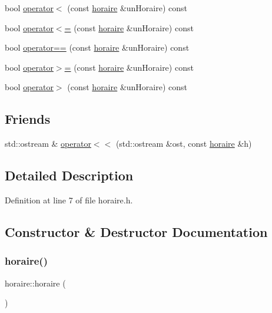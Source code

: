 \begin{DoxyCompactItemize}
\item 
bool \hyperlink{classhoraire_a2298ab292853652b934f7b881114ff12}{operator$<$} (const \hyperlink{classhoraire}{horaire} \&un\+Horaire) const
\item 
bool \hyperlink{classhoraire_a17aee5b647b4dff3d516e3fbccfb0d53}{operator$<$=} (const \hyperlink{classhoraire}{horaire} \&un\+Horaire) const
\item 
bool \hyperlink{classhoraire_ad6f3361000d688c897eb79a260fc52c8}{operator==} (const \hyperlink{classhoraire}{horaire} \&un\+Horaire) const
\item 
bool \hyperlink{classhoraire_ab8bdbbb3d453f6c470c6e3b6110342e2}{operator$>$=} (const \hyperlink{classhoraire}{horaire} \&un\+Horaire) const
\item 
bool \hyperlink{classhoraire_aa7d498b4f60474ed5ebb62bcd02cd869}{operator$>$} (const \hyperlink{classhoraire}{horaire} \&un\+Horaire) const
\end{DoxyCompactItemize}
\subsection*{Friends}
\begin{DoxyCompactItemize}
\item 
std\+::ostream \& \hyperlink{classhoraire_a152efd207823bf7d5cfb1dac6312c6b9}{operator$<$$<$} (std\+::ostream \&ost, const \hyperlink{classhoraire}{horaire} \&h)
\end{DoxyCompactItemize}


\subsection{Detailed Description}


Definition at line 7 of file horaire.\+h.



\subsection{Constructor \& Destructor Documentation}
\hypertarget{classhoraire_aa5f11a3d1a68b9ef98e6aed7e3773b29}{}\label{classhoraire_aa5f11a3d1a68b9ef98e6aed7e3773b29} 
\subsubsection{\texorpdfstring{horaire()}{horaire()}\hspace{0.1cm}{\footnotesize\ttfamily [1/3]}}
{\footnotesize\ttfamily horaire\+::horaire (\begin{DoxyParamCaption}{ }\end{DoxyParamCaption})\hspace{0.3cm}{\ttfamily [delete]}}

